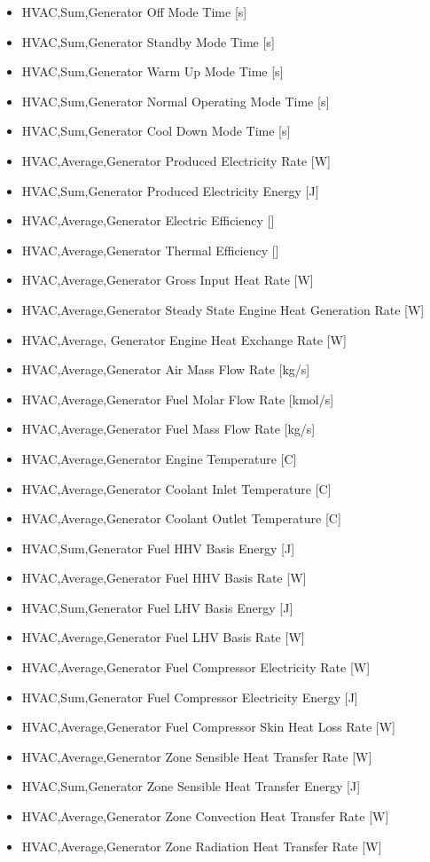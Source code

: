 \begin{itemize}
\item
  HVAC,Sum,Generator Off Mode Time {[}s{]}
\item
  HVAC,Sum,Generator Standby Mode Time {[}s{]}
\item
  HVAC,Sum,Generator Warm Up Mode Time {[}s{]}
\item
  HVAC,Sum,Generator Normal Operating Mode Time {[}s{]}
\item
  HVAC,Sum,Generator Cool Down Mode Time {[}s{]}
\item
  HVAC,Average,Generator Produced Electricity Rate {[}W{]}
\item
  HVAC,Sum,Generator Produced Electricity Energy {[}J{]}
\item
  HVAC,Average,Generator Electric Efficiency {[]}
\item
  HVAC,Average,Generator Thermal Efficiency {[]}
\item
  HVAC,Average,Generator Gross Input Heat Rate {[}W{]}
\item
  HVAC,Average,Generator Steady State Engine Heat Generation Rate {[}W{]}
\item
  HVAC,Average, Generator Engine Heat Exchange Rate {[}W{]}
\item
  HVAC,Average,Generator Air Mass Flow Rate {[}kg/s{]}
\item
  HVAC,Average,Generator Fuel Molar Flow Rate {[}kmol/s{]}
\item
  HVAC,Average,Generator Fuel Mass Flow Rate {[}kg/s{]}
\item
  HVAC,Average,Generator Engine Temperature {[}C{]}
\item
  HVAC,Average,Generator Coolant Inlet Temperature {[}C{]}
\item
  HVAC,Average,Generator Coolant Outlet Temperature {[}C{]}
\item
  HVAC,Sum,Generator Fuel HHV Basis Energy {[}J{]}
\item
  HVAC,Average,Generator Fuel HHV Basis Rate {[}W{]}
\item
  HVAC,Sum,Generator Fuel LHV Basis Energy {[}J{]}
\item
  HVAC,Average,Generator Fuel LHV Basis Rate {[}W{]}
\item
  HVAC,Average,Generator Fuel Compressor Electricity Rate {[}W{]}
\item
  HVAC,Sum,Generator Fuel Compressor Electricity Energy {[}J{]}
\item
  HVAC,Average,Generator Fuel Compressor Skin Heat Loss Rate {[}W{]}
\item
  HVAC,Average,Generator Zone Sensible Heat Transfer Rate {[}W{]}
\item
  HVAC,Sum,Generator Zone Sensible Heat Transfer Energy {[}J{]}
\item
  HVAC,Average,Generator Zone Convection Heat Transfer Rate {[}W{]}
\item
  HVAC,Average,Generator Zone Radiation Heat Transfer Rate {[}W{]}
\end{itemize}

